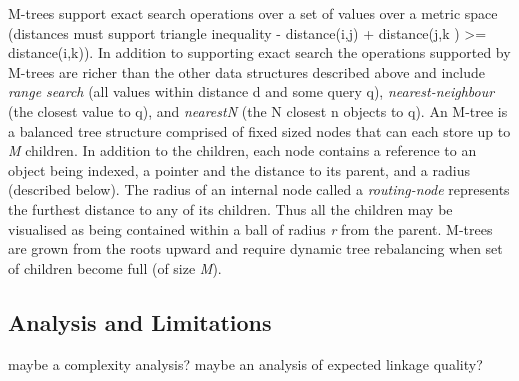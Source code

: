 \documentclass{llncs}
\begin{document}
M-trees support exact search operations over a set of values over a metric space (distances must support  triangle inequality - distance(i,j) + distance(j,k ) >= distance(i,k)). In addition to supporting exact search the operations supported by M-trees are richer than the other data structures described above and include \textit{range search} (all values within distance d and some query q), \textit{nearest-neighbour} (the closest value to q), and \textit{nearestN} (the N closest n objects to q). An M-tree is a balanced tree structure comprised of fixed sized nodes that can each store up to \textit{M} children. In addition to the children, each node contains a reference to an object being indexed, a pointer and the distance to its parent, and a radius (described below). The radius of an internal node called a \textit{routing-node} represents the  furthest distance to any of its children. Thus all the children may be visualised as being contained within a ball of radius \textit{r} from the parent. M-trees are grown from the roots upward and require dynamic tree rebalancing when set of children become full (of size \textit{M}).










\subsection{Analysis and Limitations}
\label{sec-analysis}

maybe a complexity analysis? maybe an analysis of expected 
linkage quality?

\end{document}
